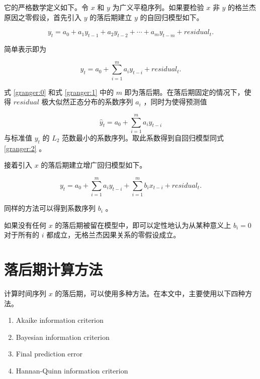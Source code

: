 它的严格数学定义如下。令 $x$ 和 $y$ 为广义平稳序列。如果要检验 $x$ 非 $y$ 的格兰杰原因之零假设，首先引入 $y$ 的落后期建立 $y$ 的自回归模型如下。

\begin{equation}
  \label{granger:0}
  y_{t}=a_{0}+a_{1}y_{t-1}+a_{2}y_{t-2}+\cdots+a_{m}y_{t-m}+residual_{t}.
\end{equation}

简单表示即为

\begin{equation}
  \label{granger:1}
  y_{t}=a_{0}+\sum_{i=1}^{m}a_{i}y_{t-i}+residual_{t}.
\end{equation}

式 \ref{granger:0} 和式 \ref{granger:1} 中的 $m$ 即为落后期。在落后期固定的情况下，使得 $residual$ 极大似然正态分布的系数序列 $a_{i}$ ，同时为使得预测值

\begin{equation}
  \label{granger:2}
  \hat{y}_{t}=a_{0}+\sum_{i=1}^{m}a_{i}y_{t-i}
\end{equation}
与标准值 $y_{t}$ 的 $L_{2}$ 范数最小的系数序列。取此系数得到自回归模型同式 \ref{granger:2} 。

接着引入 $x$ 的落后期建立增广回归模型如下。

\begin{equation}
  \label{granger:3}
  y_{t}=a_{0}+\sum_{i=1}^{m}a_{i}y_{t-i}+\sum_{i=1}^{m}b_{i}x_{t-i}+residual_{t}.
\end{equation}

同样的方法可以得到系数序列 $b_{i}$ 。

如果没有任何 $x$ 的落后期被留在模型中，即可以定性地认为从某种意义上 $b_{i}=0$
对于所有的 ${i}$ 都成立，无格兰杰因果关系的零假设成立。

\section{落后期计算方法}

计算时间序列 $x$ 的落后期，可以使用多种方法。在本文中，主要使用以下四种方法。

\begin{enumerate}
  \item Akaike information criterion
  \item Bayesian information criterion
  \item Final prediction error
  \item Hannan-Quinn information criterion
\end{enumerate}

